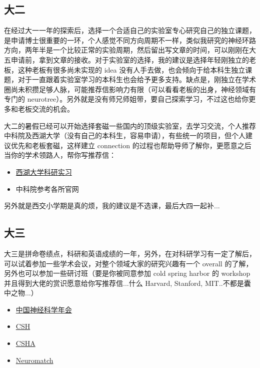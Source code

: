 \documentclass[zihao=-4,fontset=none]{Beautybook-CN}
\begin{document}
\subsection{大二}

在经过大一一年的探索后，选择一个合适自己的实验室专心研究自己的独立课题，是申请博士很重要的一环，个人感觉不同方向周期不一样，类似我研究的神经环路方向，两年半是一个比较正常的实验周期，然后留出写文章的时间，可以刚刚在大五申请前，拿到文章的接收。对于实验室的选择，我的建议是选择年轻刚独立的老板，这种老板有很多尚未实现的 idea 没有人手去做，也会倾向于给本科生独立课题，对于一直跟着实验室学习的本科生也会给予更多支持。缺点是，刚独立在学术圈尚未积攒足够人脉，可能推荐信影响力有限（可以看看老板的出身，神经领域有专门的 neurotree）。另外就是没有师兄师姐带，要自己探索学习，不过这也给你更多和老板交流的机会。

大二的暑假已经可以开始选择套磁一些国内的顶级实验室，去学习交流，个人推荐中科院及西湖大学（没有自己的本科生，容易申请），有些统一的项目，但个人建议优先和老板套磁，这样建立 connection 的过程也帮助导师了解你，更愿意之后当你的学术领路人，帮你写推荐信：
\begin{itemize}
\item \href{https://www.westlake.edu.cn/admissions_aid/shorttermprograms/}{西湖大学科研实习}

\item 中科院参考各所官网
\end{itemize}

另外就是西交小学期是真的烦，我的建议是不选课，最后大四一起补...

\subsection{大三}

大三是拼命卷绩点，科研和英语成绩的一年，另外，在对科研学习有一定了解后，可以试着参加一些学术会议，对整个领域大家的研究兴趣有一个 overall 的了解，另外也可以参加一些研讨班（要是你被同意参加 cold spring harbor 的 workshop 并且得到大佬的赏识愿意给你写推荐信...什么 Harvard, Stanford, MIT..不都是囊中之物...）
\begin{itemize}
\item \href{https://www.cns.org.cn/}{中国神经科学年会}
\item \href{https://www.cshl.edu/}{CSH}
\item \href{https://www.csh-asia.org/}{CSHA}
\item \href{https://neuromatch.io/}{Neuromatch}
\end{itemize}
\end{document}
